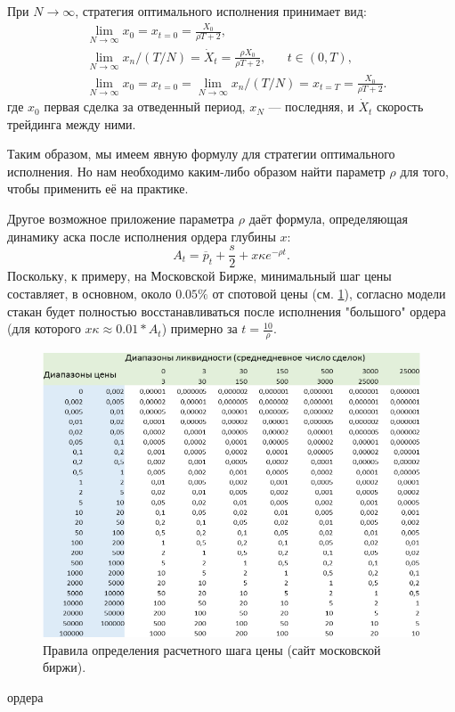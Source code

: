 \begin{theorem} \label{OEmainformula}
    При $N \rightarrow \infty$, стратегия оптимального исполнения принимает вид:
    \begin{align*}
        & \lim _{N \rightarrow \infty} x_0 = x_{t = 0} = \frac{X_0}{\rho T + 2}, \\
        & \lim _{N \rightarrow \infty} x_n / (T/N) = \dot X _t = \frac{\rho X_0}{\rho T + 2}, \;\;\;\;\;\; t \in (0, T), \\
        & \lim _{N \rightarrow \infty} x_0 = x_{t = 0} = \lim _{N \rightarrow \infty} x_n / (T/N) = x_{t=T}=  \frac{X_0}{\rho T + 2}.  %
    \end{align*}
    где $x_0$ первая сделка за отведенный период, $x_N$ --- последняя, и $\dot X _t$ скорость трейдинга между ними.
\end{theorem}


Таким образом, мы имеем явную формулу для стратегии оптимального исполнения. Но нам необходимо каким-либо образом найти
параметр $\rho$ для того, чтобы применить её на практике. \par

Другое возможное приложение параметра $\rho$ даёт формула, определяющая динамику аска после исполнения ордера глубины $x$:
\begin{equation*}
        A_t = \overline p _t + \frac{s}{2} + x \kappa e^{- \rho t}.
\end{equation*}
Поскольку, к примеру, на Московской Бирже, минимальный шаг цены составляет, в основном, около $0.05\%$ 
от спотовой цены (см. \ref{price_step}), согласно модели стакан будет полностью восстанавливаться 
после исполнения "большого" ордера (для которого $x \kappa \approx 0.01 * A_t $) примерно за $t = \frac{10}{\rho}$.
\begin{figure}
    \includegraphics[scale=0.64]{fig/price_step.png}
    \caption{Правила определения расчетного шага цены (сайт московской биржи).}
    \label{price_step}
\end{figure}
ордера
